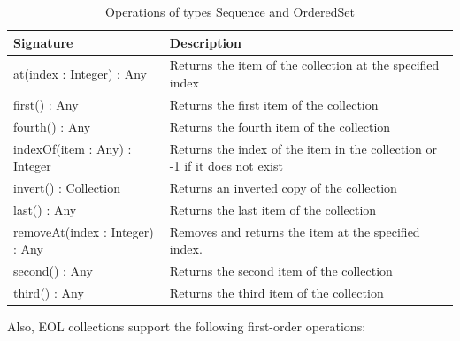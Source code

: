 \begin{longtabu} {|p{6.5cm}|X|}
\caption{Operations of types Sequence and OrderedSet}
\label{tab:SortedOperations}\\
\hline
    \textbf{Signature} & \textbf{Description} \\\hline

    at(index : Integer) : Any & Returns the item of the collection at the specified index \\\hline
    
    first() : Any & Returns the first item of the collection  \\\hline
    
    fourth() : Any & Returns the fourth item of the collection  \\\hline
    
    indexOf(item : Any) : Integer & Returns the index of the item in the collection or -1 if it does not exist \\\hline
    
    invert() : Collection & Returns an inverted copy of the collection\\\hline
    
    last() : Any & Returns the last item of the collection  \\\hline
    
    removeAt(index : Integer) : Any & Removes and returns the item at the specified index. \\\hline
    
    second() : Any & Returns the second item of the collection  \\\hline
    
    third() : Any & Returns the third item of the collection  \\\hline
\end{longtabu}

Also, EOL collections support the following first-order operations:

